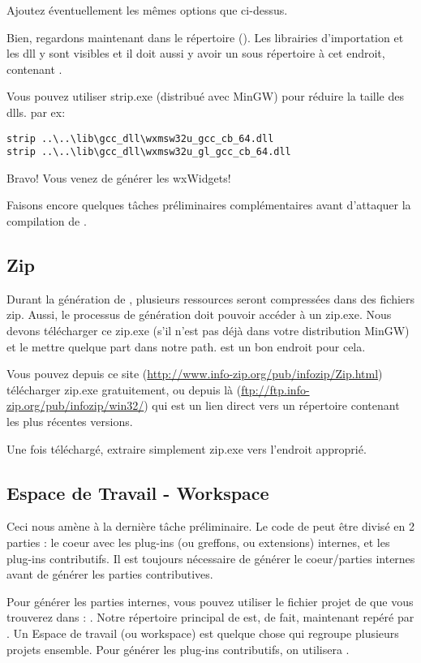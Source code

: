 Ajoutez éventuellement les mêmes options que ci-dessus.

Bien, regardons maintenant dans le répertoire (). Les librairies d'importation et les dll y sont visibles et il doit aussi y avoir un sous répertoire  à cet endroit, contenant .

Vous pouvez utiliser strip.exe (distribué avec MinGW) pour réduire la taille des dlls.
par ex:
\begin{verbatim}
strip ..\..\lib\gcc_dll\wxmsw32u_gcc_cb_64.dll
strip ..\..\lib\gcc_dll\wxmsw32u_gl_gcc_cb_64.dll
\end{verbatim}

Bravo! Vous venez de générer les wxWidgets!

Faisons encore quelques tâches préliminaires complémentaires avant d'attaquer la compilation de \codeblocks.

\subsection{Zip}

Durant la génération de \codeblocks, plusieurs ressources seront compressées dans des fichiers zip. Aussi, le processus de génération doit pouvoir accéder à un zip.exe. Nous devons télécharger ce zip.exe (s'il n'est pas déjà dans votre distribution MinGW) et le mettre quelque part dans notre path.  est un bon endroit pour cela.

Vous pouvez depuis ce site (\url{http://www.info-zip.org/pub/infozip/Zip.html}) télécharger zip.exe gratuitement, ou depuis là (\url{ftp://ftp.info-zip.org/pub/infozip/win32/}) qui est un lien direct vers un répertoire contenant les plus récentes versions.

Une fois téléchargé, extraire simplement zip.exe vers l'endroit approprié.

\subsection{Espace de Travail - Workspace}
Ceci nous amène à la dernière tâche préliminaire. Le code de \codeblocks peut être divisé en 2 parties : le coeur avec les plug-ins (ou greffons, ou extensions) internes, et les plug-ins contributifs. Il est toujours nécessaire de générer le coeur/parties internes avant de générer les parties contributives.

Pour générer les parties internes, vous pouvez utiliser le fichier projet de \codeblocks que vous trouverez dans : . Notre répertoire principal de \codeblocks est, de fait, maintenant repéré par . Un Espace de travail (ou workspace) est quelque chose qui regroupe plusieurs projets ensemble. Pour générer les plug-ins contributifs, on utilisera .

